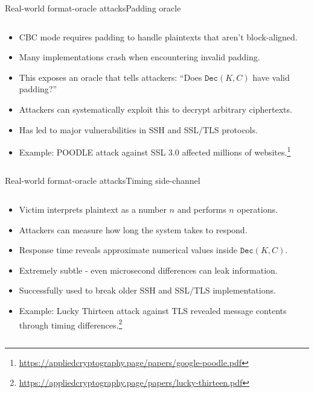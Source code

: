 \documentclass[aspectratio=169, lualatex, handout]{beamer}
\begin{document}
\begin{frame}{Real-world format-oracle attacks}{Padding oracle}
	\begin{columns}[c]
		\begin{column}{1\textwidth}
			\begin{itemize}[<+->]
				\item CBC mode requires padding to handle plaintexts that aren't block-aligned.
				\item Many implementations crash when encountering invalid padding.
				\item This exposes an oracle that tells attackers: ``Does $\texttt{Dec}(K, C)$ have valid padding?''
				\item Attackers can systematically exploit this to decrypt arbitrary ciphertexts.
				\item Has led to major vulnerabilities in SSH and SSL/TLS protocols.
				\item Example: POODLE attack against SSL 3.0 affected millions of websites.\footnote{\url{https://appliedcryptography.page/papers/google-poodle.pdf}}
			\end{itemize}
		\end{column}
	\end{columns}
\end{frame}

\begin{frame}{Real-world format-oracle attacks}{Timing side-channel}
	\begin{columns}[c]
		\begin{column}{1\textwidth}
			\begin{itemize}[<+->]
				\item Victim interprets plaintext as a number $n$ and performs $n$ operations.
				\item Attackers can measure how long the system takes to respond.
				\item Response time reveals approximate numerical values inside $\texttt{Dec}(K, C)$.
				\item Extremely subtle - even microsecond differences can leak information.
				\item Successfully used to break older SSH and SSL/TLS implementations.
				\item Example: Lucky Thirteen attack against TLS revealed message contents through timing differences.\footnote{\url{https://appliedcryptography.page/papers/lucky-thirteen.pdf}}
			\end{itemize}
		\end{column}
	\end{columns}
\end{frame}
\end{document}
